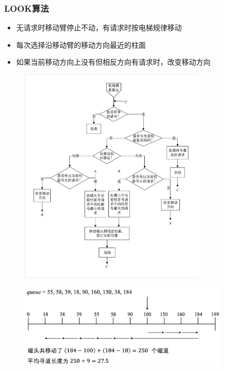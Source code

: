 \documentclass[cs4size,a4paper,10pt]{ctexart}
\begin{document}
	\subsubsection{LOOK算法}
	\begin{itemize}
		\item 无请求时移动臂停止不动，有请求时按电梯规律移动
		\item 每次选择沿移动臂的移动方向最近的柱面
		\item 如果当前移动方向上没有但相反方向有请求时，改变移动方向
	\end{itemize}
	\begin{figure}[H]
		\centering
		\includegraphics[width=0.8\textwidth]{img/LOOK.pdf}
	\end{figure}
	\begin{figure}[H]
		\centering
		\includegraphics[width=0.9\textwidth]{img/LOOK.png}
	\end{figure}
\end{document}
